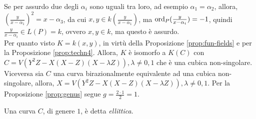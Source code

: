         Se per assurdo due degli $\alpha_i$ sono uguali tra loro, ad esempio $\alpha_1 = \alpha_2$, allora, $(\frac{y}{x -\alpha_1})^2 = x - \alpha_3$, 
        da cui $x,y \in k(\frac{y}{x-\alpha_1})$, ma $\text{ord}_P(\frac{y}{x - \alpha_i}) = -1$, quindi $\frac{y}{x - \alpha_i} \in L(P) = k$, ovvero $x,y \in k$, 
        ma questo è assurdo. \\
        Per quanto visto $K = k(x,y)$, in virtù della Proposizione \ref{prop:fun-fields} e per la Proposizione \ref{prop:techn4}. Allora, $K$ è isomorfo a $K(C)$ con $C = V(Y^2Z-X(X-Z)(X-\lambda Z)), 
        \lambda \neq 0,1$ che è una cubica non-singolare.\\
        \noindent Viceversa sia $C$ una curva birazionalmente equivalente ad una cubica non-singolare, allora, $X = V(Y^2Z-X(X-Z)(X-\lambda Z)), \lambda \neq 0,1$. 
        Per la Proposizione \ref{prop:genus} segue $g = \frac{2 \cdot 1}{2} = 1$.
        \begin{definizione}
            Una curva $C$, di genere $1$, è detta \emph{ellittica}.
        \end{definizione}